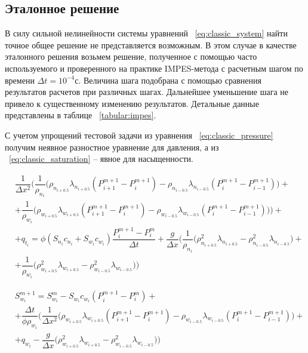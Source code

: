 \subsection{Эталонное решение}
\label{reference sample}
В силу сильной нелинейности системы уравнений ~\eqref{eq:classic_system} найти точное общее решение не представляется возможным.
В этом случае в качестве эталонного решения возьмем решение, полученное с помощью часто используемого и проверенного на практике IMPES-метода с расчетным шагом по
времени $\Delta t = 10^{-4}\text{с}$. Величина шага подобрана с помощью сравнения результатов расчетов при различных шагах.
Дальнейшее уменьшение шага не привело к существенному изменению результатов. Детальные данные представлены в таблице ~\ref{tabular:impes}.

С учетом упрощений тестовой задачи из уравнения ~\eqref{eq:classic_pressure} получим неявное разностное уравнение для давления,
а из ~\eqref{eq:classic_saturation} -- явное для насыщенности.

\begin{equation} \label{eq:scheme_p}
 \begin{aligned} 
  & \dfrac{1}{\Delta x^2} \bigg(\dfrac{1}{\rho_{n_i}} \big( \rho_{n_{i+0.5}} \lambda_{n_{i+0.5}} (P_{i+1}^{m+1} - P_i^{m+1})
  - \rho_{n_{i-0.5}} \lambda_{n_{i-0.5}} (P_i^{m+1} - P_{i-1}^{m+1})\big) + \\
  &+ \dfrac{1}{\rho_{w_i}} \big( \rho_{w_{i+0.5}} \lambda_{w_{i+0.5}} (P_{i+1}^{m+1} - P_i^{m+1})
  - \rho_{w_{i-0.5}} \lambda_{w_{i-0.5}} (P_i^{m+1} - P_{i-1}^{m+1})\big)\bigg) + \\
  & + q_{t_i} = \phi(S_{n_i}c_{n_i}+S_{w_i}c_{w_i}) \dfrac{P_i^{m+1} - P_i^m}{\Delta t}
  + \dfrac{g}{\Delta x} \bigg(\dfrac{1}{\rho_{n_i}} \big( \rho_{n_{i+0.5}}^2 \lambda_{n_{i+0.5}} 
  - \rho_{n_{i-0.5}}^2 \lambda_{n_{i-0.5}} \big) + \\
  &+ \dfrac{1}{\rho_{w_i}} \big( \rho_{w_{i+0.5}}^2 \lambda_{w_{i+0.5}} 
  - \rho_{w_{i-0.5}}^2 \lambda_{w_{i-0.5}} \big)\bigg)
 \end{aligned}
\end{equation}

\begin{equation} \label{eq:scheme_s}
 \begin{aligned} 
  & S_{w_i}^{m+1} = S_{w_i}^{m} - S_{w_i}c_{w_i} (P_i^{m+1} - P_i^m) + \\
  & + \dfrac{\Delta t}{\phi\rho_{w_i}}\Bigg( \dfrac{1}{\Delta x^2} \bigg(\rho_{w_{i+0.5}} \lambda_{w_{i+0.5}} (P_{i+1}^{m+1} - P_i^{m+1})
  - \rho_{w_{i-0.5}} \lambda_{w_{i-0.5}} (P_i^{m+1} - P_{i-1}^{m+1}) \bigg) +\\
  & + q_{w_i} - \dfrac{g}{\Delta x} \bigg(\rho_{w_{i+0.5}}^2 \lambda_{w_{i+0.5}} - \rho_{w_{i-0.5}}^2 \lambda_{w_{i-0.5}} \bigg) \Bigg)
 \end{aligned}
\end{equation}

